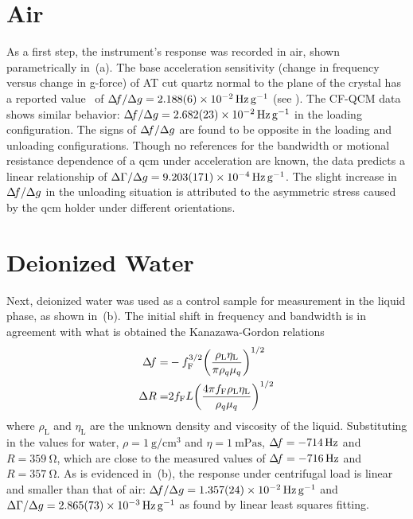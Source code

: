 \section{Air}
As a first step, the instrument's response was recorded in air, shown
parametrically in \,(a).  The base acceleration
sensitivity (change in frequency versus change in g-force) of AT cut quartz
normal to the plane of the crystal has a reported
value~\cite{valdois2794influence} of $\df/\Delta g
	=\SI{2.188(6)e-2}{\hertz\per\g}$ (see
).  The CF-QCM data shows similar
behavior: $\df/\Delta g =\SI{2.682(23)e-2}{\hertz\per\g}$ in the loading
configuration.  The signs of $\Delta\!f/\Delta g$ are found to be opposite in the
loading and unloading configurations.  Though no references for
the bandwidth or motional resistance dependence of a \gls{qcm} under
acceleration are known, the data predicts a linear relationship of $\dg/\Delta g =
	\SI{9.203(171)e-4}{\hertz\per\g}$.  The slight increase in $\Delta\!f/\Delta g$
in the unloading situation is attributed to the asymmetric stress caused by
the \gls{qcm} holder under different orientations.

\section{Deionized Water}
Next, deionized water was used as a control sample for measurement in the
liquid phase, as shown in \,(b).  The initial shift in
frequency and bandwidth is in agreement with what is obtained the
Kanazawa-Gordon relations~\cite{kanazawa1985frequency}
\begin{align}
	\Delta\!f=      & -f_{\text{F}}^{3/2}{\left(\frac{\rho_{\text{L}}\eta_{\text{L}}}{\pi\rho_{q}\mu_{q}}\right)}^{1/2} \\
	\Delta R= & 2f_{\text{F}}L{\left(\frac{4\pi
		f_{\text{F}}\rho_{\text{L}}\eta_{\text{L}}}{\rho_{q}\mu_{q}}\right)}^{1/2}
\end{align}
where $\rho_{\text{L}}$ and $\eta_{\text{L}}$ are the unknown density and
viscosity of the liquid.   Substituting in the values for water,
$\rho=\SI{1}{\gram\per\centi\meter\cubed}$ and
$\eta=\SI{1}{\milli\pascal\second}$, $\Delta\!f = \SI{-714}{\hertz}$ and
$R=\SI{359}{\ohm}$, which are close to the measured values of $\Delta\!f =
	\SI{-716}{\hertz}$ and $R=\SI{357}{\ohm}$.  As is evidenced in
\,(b), the response under centrifugal
load is linear and smaller than that of air: $\df/\Delta g=
	\SI{1.357(24)e-2}{\hertz \per\g}$ and $\dg/\Delta g=
	\SI{2.865(73)e-3}{\hertz\per\g}$ as found by linear least squares fitting.

